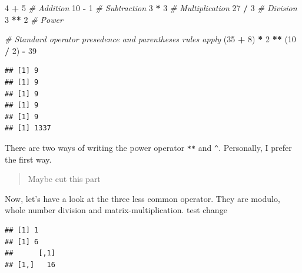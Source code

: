 \documentclass[]{book}
\newenvironment{Shaded}{\begin{snugshade}}{\end{snugshade}}
\newcommand{\KeywordTok}[1]{\textcolor[rgb]{0.13,0.29,0.53}{\textbf{#1}}}
\newcommand{\DecValTok}[1]{\textcolor[rgb]{0.00,0.00,0.81}{#1}}
\newcommand{\StringTok}[1]{\textcolor[rgb]{0.31,0.60,0.02}{#1}}
\newcommand{\CommentTok}[1]{\textcolor[rgb]{0.56,0.35,0.01}{\textit{#1}}}
\newcommand{\OperatorTok}[1]{\textcolor[rgb]{0.81,0.36,0.00}{\textbf{#1}}}
\newcommand{\NormalTok}[1]{#1}
\theoremstyle{definition}
\theoremstyle{definition}
\theoremstyle{definition}
\theoremstyle{remark}
\begin{document}
\begin{Shaded}
\begin{Highlighting}[]
\DecValTok{4} \OperatorTok{+}\StringTok{ }\DecValTok{5}    \CommentTok{# Addition}
\DecValTok{10} \OperatorTok{-}\StringTok{ }\DecValTok{1}   \CommentTok{# Subtraction}
\DecValTok{3} \OperatorTok{*}\StringTok{ }\DecValTok{3}    \CommentTok{# Multiplication}
\DecValTok{27} \OperatorTok{/}\StringTok{ }\DecValTok{3}   \CommentTok{# Division}
\DecValTok{3} \OperatorTok{**}\StringTok{ }\DecValTok{2}   \CommentTok{# Power}

\CommentTok{# Standard operator presedence and parentheses rules apply}
\NormalTok{(}\DecValTok{35} \OperatorTok{+}\StringTok{ }\DecValTok{8}\NormalTok{) }\OperatorTok{*}\StringTok{ }\DecValTok{2} \OperatorTok{**}\StringTok{ }\NormalTok{(}\DecValTok{10} \OperatorTok{/}\StringTok{ }\DecValTok{2}\NormalTok{) }\OperatorTok{-}\StringTok{ }\DecValTok{39}
\end{Highlighting}
\end{Shaded}

\begin{verbatim}
## [1] 9
## [1] 9
## [1] 9
## [1] 9
## [1] 9
## [1] 1337
\end{verbatim}

There are two ways of writing the power operator \texttt{**} and
\texttt{\^{}}. Personally, I prefer the first way.

\begin{quote}
Maybe cut this part
\end{quote}

Now, let's have a look at the three less common operator. They are
modulo, whole number division and matrix-multiplication. test change

\begin{Shaded}
\end{Shaded}

\begin{verbatim}
## [1] 1
## [1] 6
##      [,1]
## [1,]   16
\end{verbatim}
\end{document}
